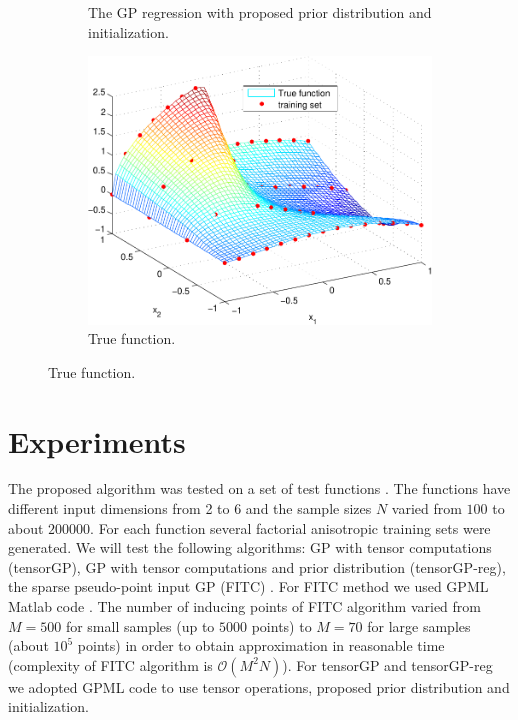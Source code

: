 \begin{figure}
\begin{subfigure}[b]{0.45\textwidth}
      \caption{The GP regression with proposed prior distribution and initialization.}
      \label{fig:nondegenerate_tensorGP}
  \end{subfigure}
  \begin{subfigure}[b]{0.45\textwidth}
      \includegraphics[width=\textwidth]{figures/gp_on_grid/degeneration_true.pdf}
      \caption{True function.}
      \label{fig:anisotropy_degeneracy_true}
  \end{subfigure}
\end{figure}


\section{Experiments}
The proposed algorithm was tested on a set of test functions \citep{lappeenranta, ETH}.
The functions have different input dimensions from 2 to 6 and the sample sizes $N$
varied from $100$ to about $200000$.
For each function several factorial anisotropic training sets were generated.
We will test the following algorithms: GP with tensor computations (tensorGP),
GP with tensor computations and prior distribution (tensorGP-reg),
the sparse pseudo-point input GP (FITC) \citep{snelson06sparsegaussian}.
For FITC method we used GPML Matlab code \citep{gpmltoolbox}.
The number of inducing points of FITC algorithm varied from $M = 500$ for small samples (up to $5000$ points)
to $M = 70$ for large samples (about $10^5$ points) in order to obtain approximation in reasonable time
(complexity of FITC algorithm is $\mathcal{O}(M^2N)$).
For tensorGP and tensorGP-reg we adopted GPML code to use tensor operations, proposed prior distribution
and initialization.


